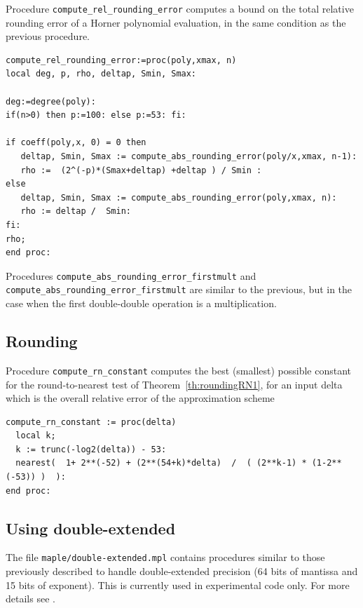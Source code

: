 Procedure \texttt{compute\_rel\_rounding\_error} computes a bound on
the total relative rounding error of a Horner polynomial evaluation,
in the same condition as the previous procedure.

\begin{lstlisting}[caption={compute\_abs\_rounding\_error},firstnumber=1]
compute_rel_rounding_error:=proc(poly,xmax, n)
local deg, p, rho, deltap, Smin, Smax:

deg:=degree(poly):
if(n>0) then p:=100: else p:=53: fi: 

if coeff(poly,x, 0) = 0 then
   deltap, Smin, Smax := compute_abs_rounding_error(poly/x,xmax, n-1):
   rho :=  (2^(-p)*(Smax+deltap) +deltap ) / Smin :
else
   deltap, Smin, Smax := compute_abs_rounding_error(poly,xmax, n):
   rho := deltap /  Smin:
fi:
rho;
end proc:
\end{lstlisting}
\vspace{0.5cm}

Procedures \texttt{compute\_abs\_rounding\_error\_firstmult} and
\texttt{compute\_abs\_rounding\_error\_firstmult} are similar to the
previous, but in the case when the first double-double operation is a
multiplication.



\subsection{Rounding}

Procedure \texttt{compute\_rn\_constant} computes the best (smallest)
possible constant for the round-to-nearest test of
Theorem~\ref{th:roundingRN1}, for an input delta which is the overall
relative error of the approximation scheme

\begin{lstlisting}[caption={compute\_rn\_constant},firstnumber=1]
compute_rn_constant := proc(delta)
  local k;
  k := trunc(-log2(delta)) - 53: 
  nearest(  1+ 2**(-52) + (2**(54+k)*delta)  /  ( (2**k-1) * (1-2**(-53)) )  ):
end proc:
\end{lstlisting}
\vspace{0.5cm}



\subsection{Using double-extended}

The file \texttt{maple/double-extended.mpl} contains procedures
similar to those previously described to handle double-extended
precision (64 bits of mantissa and 15 bits of exponent). This is currently used
in experimental code only. For more details see \cite{DinDefLau2004LIP,DinGast2004LIP}.
